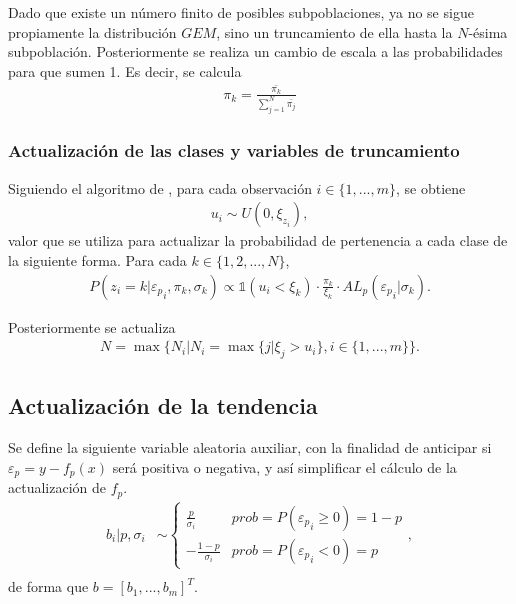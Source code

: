 Dado que existe un n\'umero finito de posibles subpoblaciones, ya no se sigue propiamente la distribuci\'on $GEM$, sino un truncamiento de ella hasta la $N$-\'esima subpoblaci\'on. Posteriormente se realiza un cambio de escala a las probabilidades para que sumen 1. Es decir, se calcula
\begin{equation*}
\begin{aligned}
    \pi_k = \frac{\bar{\pi_k}}{\sum_{j=1}^N \bar{\pi_j}}
\end{aligned}
\end{equation*}

\subsubsection{Actualizaci\'on de las clases y variables de truncamiento}

Siguiendo el algoritmo de \cite{Kalli_Slice}, para cada observaci\'on $i \in \{1,...,m\}$, se obtiene
\begin{equation*}
\begin{aligned}
   u_i \sim U(0, \xi_{z_i}),
\end{aligned}
\end{equation*}
valor que se utiliza para actualizar la probabilidad de pertenencia a cada clase de la siguiente forma. Para cada $k \in \{1,2,...,N\}$,
\begin{equation*}
\begin{aligned}
   P(z_i = k| {\varepsilon_p}_i, \pi_k, \sigma_k)
   \propto
   \mathds{1}(u_i < \xi_k)
   \cdot
   \frac{\pi_k}{\xi_k}
   \cdot
   AL_p({\varepsilon_p}_i | \sigma_k).
\end{aligned}
\end{equation*}

Posteriormente se actualiza
\begin{equation*}
\begin{aligned}
   N = \max\{
    N_i|N_i=\max\{j|\xi_j > u_i\}, 
    i \in \{1,...,m\}
   \}.
\end{aligned}
\end{equation*}

\subsection{Actualizaci\'on de la tendencia}

Se define la siguiente variable aleatoria auxiliar, con la finalidad de anticipar si $\varepsilon_p = y - f_p(x)$ ser\'a positiva o negativa, y as\'i simplificar el c\'alculo de la actualizaci\'on de $f_p$.
\begin{equation*}
\begin{aligned}
    b_i | p, \sigma_i &\sim 
    \begin{cases}
        \frac{p}{\sigma_i} &prob = P({\varepsilon_p}_i \geq 0) = 1-p\\
        -\frac{1-p}{\sigma_i} &prob = P({\varepsilon_p}_i < 0) = p
    \end{cases},\\
\end{aligned}
\end{equation*}
de forma que $b = [b_1,...,b_m]^T$. 

